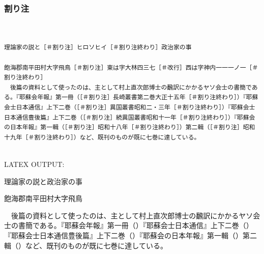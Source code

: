 \documentclass[a4paper,tate]{jlreq}
\begin{document}
\newpage
\subsubsection*{割り注}
\footnotesize
\linespread{1.0}
\begin{verbatim}


理論家の説と［＃割り注］ヒロソヒイ［＃割り注終わり］政治家の事

飽海郡南平田村大字飛鳥［＃割り注］東は字大林四三七［＃改行］西は字神内一一一ノ一［＃割り注終わり］
　後篇の資料として使ったのは、主として村上直次郎博士の飜訳にかかるヤソ会士の書簡である。『耶蘇会年報』第一冊（［＃割り注］長崎叢書第二巻大正十五年［＃割り注終わり］）『耶蘇会士日本通信』上下二巻（［＃割り注］異国叢書昭和二・三年［＃割り注終わり］）『耶蘇会士日本通信豊後篇』上下二巻（［＃割り注］続異国叢書昭和十一年［＃割り注終わり］）『耶蘇会の日本年報』第一輯（［＃割り注］昭和十八年［＃割り注終わり］）第二輯（［＃割り注］昭和十九年［＃割り注終わり］）など、既刊のものが既に七巻に達している。


\end{verbatim}
\linespread{1.4}
\normalsize
LATEX OUTPUT:
\zw



理論家の説と政治家の事


飽海郡南平田村大字飛鳥

　後篇の資料として使ったのは、主として村上直次郎博士の飜訳にかかるヤソ会士の書簡である。『耶蘇会年報』第一冊（）『耶蘇会士日本通信』上下二巻（）『耶蘇会士日本通信豊後篇』上下二巻（）『耶蘇会の日本年報』第一輯（）第二輯（）など、既刊のものが既に七巻に達している。




\newpage
\end{document}
